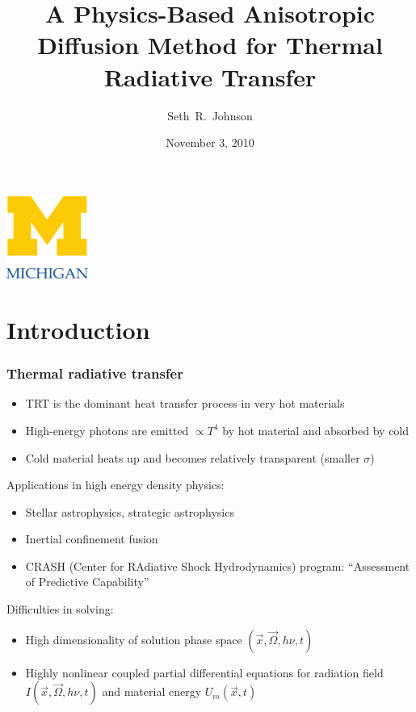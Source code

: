 \documentclass{beamer}
\title[Thesis Prospectus]%
{A Physics-Based Anisotropic Diffusion Method for Thermal Radiative
Transfer}
\author[SRJ]{Seth~R.~Johnson}
\institute[UMich]{
University of Michigan, Ann Arbor
}
\date[11/3/2010]{November 3, 2010}
\begin{document}

\begin{frame}
\titlepage
\begin{center}
  \includegraphics[width=0.2\textwidth]{../figures/umlogo}
\end{center}
\end{frame}

\section{Introduction}
\begin{frame}
  \frametitle{Thermal radiative transfer}
  \begin{itemize}
    \item TRT is the dominant heat transfer process in very hot materials
    \item High-energy photons are emitted $\propto T^4$ by hot material and
      absorbed by cold
    \item Cold material heats up and becomes relatively transparent (smaller
      $\sigma$)
  \end{itemize}

  Applications in high energy density physics:
  \begin{itemize}
    \item Stellar astrophysics, strategic astrophysics
    \item Inertial confinement fusion
    \item CRASH (Center for RAdiative Shock Hydrodynamics) program: ``Assessment
          of Predictive Capability''
  \end{itemize}
  Difficulties in solving:
  \begin{itemize}
    \item High dimensionality of solution phase space $(\vec{x}, \vec{\Omega},
      h\nu, t)$
    \item Highly nonlinear coupled partial differential equations for radiation
      field $I(\vec{x}, \vec{\Omega}, h\nu, t)$ and material energy $U_m(\vec{x}, t)$
  \end{itemize}
\end{frame}
\end{document}
